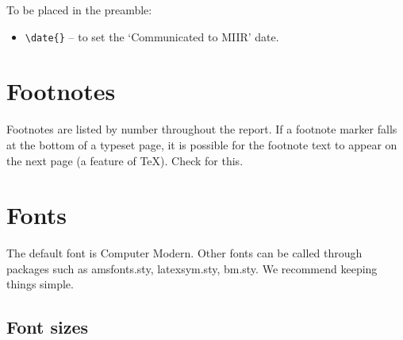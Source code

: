 \documentclass{MIIR}
\theoremstyle{plain}
\theoremstyle{definition}
\begin{document}
To be placed in the preamble:
\begin{itemize}
  \item \verb"\date{}" -- to set the `Communicated to MIIR' date.
\end{itemize}

\section{Footnotes}

Footnotes are listed by number throughout the report. If a footnote marker falls at the bottom of a typeset page, it is possible for the
footnote text to appear on the next page (a feature of \TeX ). Check
for this.

\section{Fonts}
The default font is Computer Modern. Other fonts can be called through packages such as amsfonts.sty, latexsym.sty, bm.sty.
We recommend keeping things simple.

\subsection{Font sizes}
\end{document}
